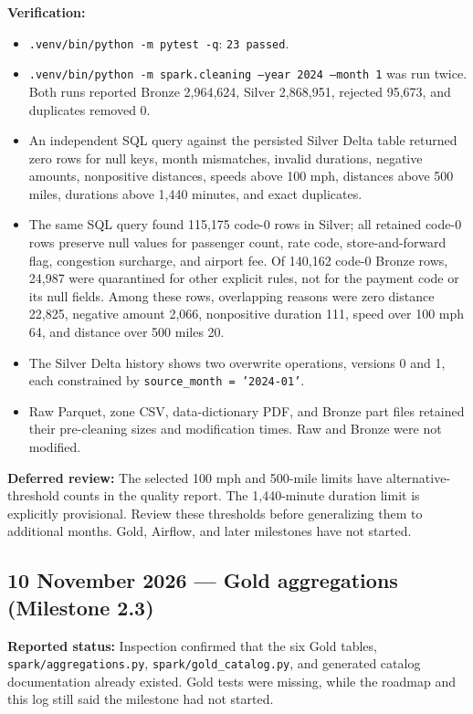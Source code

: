 \documentclass[11pt,a4paper]{article}
\begin{document}
\textbf{Verification:}
\begin{itemize}
  \item \texttt{.venv/bin/python -m pytest -q}: \texttt{23 passed}.
  \item \texttt{.venv/bin/python -m spark.cleaning --year 2024 --month 1}
        was run twice. Both runs reported Bronze 2,964,624, Silver 2,868,951,
        rejected 95,673, and duplicates removed 0.
  \item An independent SQL query against the persisted Silver Delta table
        returned zero rows for null keys, month mismatches, invalid durations,
        negative amounts, nonpositive distances, speeds above 100 mph,
        distances above 500 miles, durations above 1,440 minutes, and exact
        duplicates.
  \item The same SQL query found 115,175 code-0 rows in Silver; all retained
        code-0 rows preserve null values for passenger count, rate code,
        store-and-forward flag, congestion surcharge, and airport fee.
        Of 140,162 code-0 Bronze rows, 24,987 were quarantined for other
        explicit rules, not for the payment code or its null fields. Among
        these rows, overlapping reasons were zero distance 22,825, negative
        amount 2,066, nonpositive duration 111, speed over 100 mph 64, and
        distance over 500 miles 20.
  \item The Silver Delta history shows two overwrite operations, versions 0
        and 1, each constrained by
        \texttt{source\_month = '2024-01'}.
  \item Raw Parquet, zone CSV, data-dictionary PDF, and Bronze part files
        retained their pre-cleaning sizes and modification times. Raw and
        Bronze were not modified.
\end{itemize}

\textbf{Deferred review:} The selected 100 mph and 500-mile limits have
alternative-threshold counts in the quality report. The 1,440-minute duration
limit is explicitly provisional. Review these thresholds before generalizing
them to additional months. Gold, Airflow, and later milestones have not started.

\subsection{10 November 2026 --- Gold aggregations (Milestone 2.3)}
\textbf{Reported status:} Inspection confirmed that the six Gold tables,
\texttt{spark/aggregations.py}, \texttt{spark/gold\_catalog.py}, and generated
catalog documentation already existed. Gold tests were missing, while the
roadmap and this log still said the milestone had not started.
\end{document}
